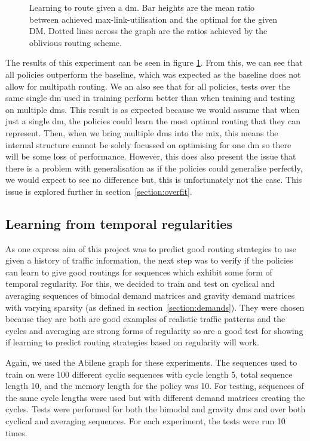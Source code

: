 \begin{figure}
    \centering
    
    \caption{Learning to route given a \ac{dm}. Bar heights are the mean ratio between achieved max-link-utilisation and the optimal for the given DM. Dotted lines across the graph are the ratios achieved by the oblivious routing scheme.}
    \label{fig:exp_static}
\end{figure}

The results of this experiment can be seen in figure \ref{fig:exp_static}. From this, we can see that all policies outperform the baseline, which was expected as the baseline does not allow for multipath routing. We an also see that for all policies, tests over the same single \ac{dm} used in training perform better than when training and testing on multiple \acp{dm}. This result is as expected because we would assume that when just a single \ac{dm}, the policies could learn the most optimal routing that they can represent. Then, when we bring multiple \acp{dm} into the mix, this means the internal structure cannot be solely focussed on optimising for one \ac{dm} so there will be some loss of performance. However, this does also present the issue that there is a problem with generalisation as if the policies could generalise perfectly, we would expect to see no difference but, this is unfortunately not the case. This issue is explored further in section~\ref{section:overfit}.


\subsection{Learning from temporal regularities}
As one express aim of this project was to predict good routing strategies to use given a history of traffic information, the next step was to verify if the policies can learn to give good routings for sequences which exhibit some form of temporal regularity. For this, we decided to train and test on cyclical and averaging sequences of bimodal demand matrices and gravity demand matrices with varying sparsity (as defined in section~\ref{section:demands}). They were chosen because they are both are good examples of realistic traffic patterns and the cycles and averaging are strong forms of regularity so are a good test for showing if learning to predict routing strategies based on regularity will work.

Again, we used the Abilene graph for these experiments. The sequences used to train on were 100 different cyclic sequences with cycle length 5, total sequence length 10, and the memory length for the policy was 10. For testing, sequences of the same cycle lengths were used but with different demand matrices creating the cycles. Tests were performed for both the bimodal and gravity \acp{dm} and over both cyclical and averaging sequences. For each experiment, the tests were run 10 times.

